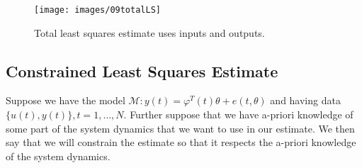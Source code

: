 \begin{figure}[ht!]
\centering
\texttt{[image: images/09totalLS]}
\caption{Total least squares estimate uses inputs and outputs.}
\label{fig:09totalLS}
\end{figure}

\subsection{Constrained Least Squares Estimate}
Suppose we have the model $\mathcal{M}: y(t) = \varphi^T(t)\theta + e(t,\theta)$ and having data $\{u(t),y(t)\}, t=1,\ldots,N$.
Further suppose that we have a-priori knowledge of some part of the system dynamics that we want to use in our estimate.
We then say that we will constrain the estimate so that it respects the a-priori knowledge of the system dynamics.

